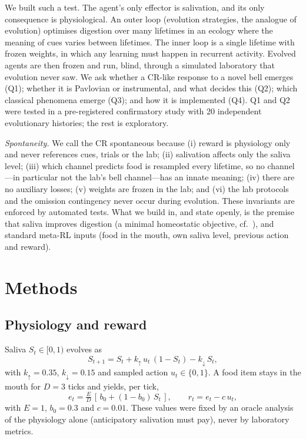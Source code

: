 \documentclass[conference]{IEEEtran}
\begin{document}
We built such a test. The agent's only effector is salivation, and its only consequence is physiological. An outer loop (evolution strategies, the analogue of evolution) optimises digestion over many lifetimes in an ecology where the meaning of cues varies between lifetimes. The inner loop is a single lifetime with frozen weights, in which any learning must happen in recurrent activity. Evolved agents are then frozen and run, blind, through a simulated laboratory that evolution never saw. We ask whether a CR-like response to a novel bell emerges (Q1); whether it is Pavlovian or instrumental, and what decides this (Q2); which classical phenomena emerge (Q3); and how it is implemented (Q4). Q1 and Q2 were tested in a pre-registered confirmatory study with 20 independent evolutionary histories; the rest is exploratory.

\textit{Spontaneity.} We call the CR spontaneous because (i) reward is physiology only and never references cues, trials or the lab; (ii) salivation affects only the saliva level; (iii) which channel predicts food is resampled every lifetime, so no channel---in particular not the lab's bell channel---has an innate meaning; (iv) there are no auxiliary losses; (v) weights are frozen in the lab; and (vi) the lab protocols and the omission contingency never occur during evolution. These invariants are enforced by automated tests. What we build in, and state openly, is the premise that saliva improves digestion (a minimal homeostatic objective, cf.~\cite{keramati14}), and standard meta-RL inputs (food in the mouth, own saliva level, previous action and reward).

\section{Methods}

\subsection{Physiology and reward}
Saliva $S_t\in[0,1)$ evolves as
\begin{equation}
S_{t+1}=S_t+k_{\uparrow}\,u_t\,(1-S_t)-k_{\downarrow}\,S_t,
\end{equation}
with $k_{\uparrow}=0.35$, $k_{\downarrow}=0.15$ and sampled action $u_t\in\{0,1\}$. A food item stays in the mouth for $D=3$ ticks and yields, per tick,
\begin{equation}
e_t=\tfrac{E}{D}\,[\,b_0+(1-b_0)\,S_t\,],\qquad r_t=e_t-c\,u_t,
\end{equation}
with $E=1$, $b_0=0.3$ and $c=0.01$. These values were fixed by an oracle analysis of the physiology alone (anticipatory salivation must pay), never by laboratory metrics.
\end{document}
